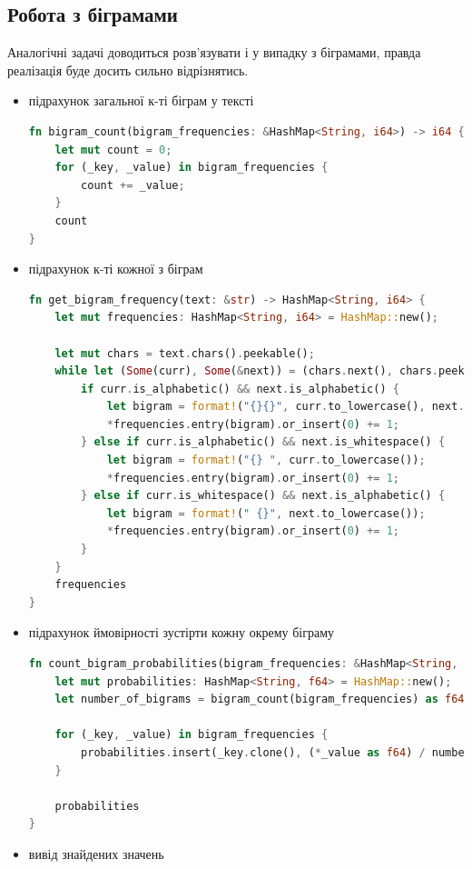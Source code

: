 \documentclass[12pt]{article}
\begin{document}
\subsection{Робота з біграмами}
\quad Аналогічні задачі доводиться розв'язувати і у випадку з біграмами, правда реалізація буде досить сильно відрізнятись.
\begin{itemize}
    \item підрахунок загальної к-ті біграм у тексті
\begin{lstlisting}[language=Rust]
fn bigram_count(bigram_frequencies: &HashMap<String, i64>) -> i64 {
    let mut count = 0;
    for (_key, _value) in bigram_frequencies {
        count += _value;
    }
    count
}
\end{lstlisting}

    \item підрахунок к-ті кожної з біграм
\begin{lstlisting}[language=Rust]
fn get_bigram_frequency(text: &str) -> HashMap<String, i64> {
    let mut frequencies: HashMap<String, i64> = HashMap::new();

    let mut chars = text.chars().peekable();
    while let (Some(curr), Some(&next)) = (chars.next(), chars.peek()) {
        if curr.is_alphabetic() && next.is_alphabetic() {
            let bigram = format!("{}{}", curr.to_lowercase(), next.to_lowercase());
            *frequencies.entry(bigram).or_insert(0) += 1;
        } else if curr.is_alphabetic() && next.is_whitespace() {
            let bigram = format!("{} ", curr.to_lowercase());
            *frequencies.entry(bigram).or_insert(0) += 1;
        } else if curr.is_whitespace() && next.is_alphabetic() {
            let bigram = format!(" {}", next.to_lowercase());
            *frequencies.entry(bigram).or_insert(0) += 1;
        }
    }
    frequencies
}
\end{lstlisting}
    \item підрахунок ймовірності зустірти кожну окрему біграму
\begin{lstlisting}[language=Rust]
fn count_bigram_probabilities(bigram_frequencies: &HashMap<String, i64>) -> HashMap<String, f64> {
    let mut probabilities: HashMap<String, f64> = HashMap::new();
    let number_of_bigrams = bigram_count(bigram_frequencies) as f64;

    for (_key, _value) in bigram_frequencies {
        probabilities.insert(_key.clone(), (*_value as f64) / number_of_bigrams);
    }

    probabilities
}
\end{lstlisting}

    \item вивід знайдених значень
\end{itemize}
\end{document}
